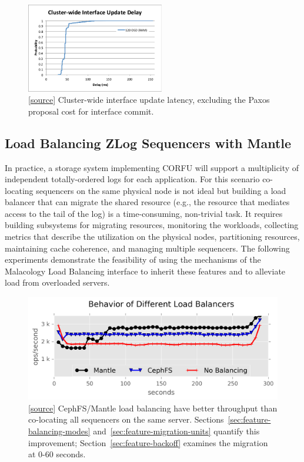 \begin{figure}[tbp]
\centering
\includegraphics[width=60mm,trim={1 4 4 1.3cm},clip]{figures/iface-update-delay.pdf}
\caption{
[\href{https://github.com/michaelsevilla/malacology-popper/tree/v2.1/experiments/mon-paxos-update/viz.py}{source}]
Cluster-wide interface update latency, excluding the Paxos proposal cost for
interface commit.}
\label{fig:propdelay}
\end{figure}

\subsection{Load Balancing ZLog Sequencers with Mantle}
\label{sec:zlog-balancing}

In practice, a storage system implementing CORFU will support a multiplicity of
independent totally-ordered logs for each application.  For this scenario
co-locating sequencers on the same physical node is not ideal but building a
load balancer that can migrate the shared resource (e.g., the resource
that mediates access to the tail of the log) is a time-consuming, non-trivial
task.  It requires building subsystems for migrating resources, monitoring the
workloads, collecting metrics that describe the utilization on the physical
nodes, partitioning resources, maintaining cache coherence, and managing
multiple sequencers. The following experiments demonstrate the feasibility of
using the mechanisms of the Malacology Load Balancing interface to inherit
these features and to alleviate load from overloaded servers.

\begin{figure}[t!]
\centering
\includegraphics{figures/mantle-balancer-behaviors.png}
\caption{
[\href{https://github.com/michaelsevilla/malacology-popper/blob/v2.1/experiments/mds-zlog-seq-migrate-redux-3client/results-mantle-runs/visualize.ipynb}{source}]
CephFS/Mantle load balancing have better throughput than co-locating all
sequencers on the same server.  Sections~\ref{sec:feature-balancing-modes}
and~\ref{sec:feature-migration-units} quantify this improvement;
Section~\ref{sec:feature-backoff} examines the migration at 0-60 seconds.
}\label{fig:mantle-balancer-behaviors}
\end{figure}

